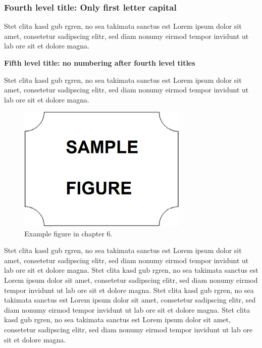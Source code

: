 \subsubsection{Fourth level title: Only first letter capital}

Stet clita kasd gub rgren, no sea takimata sanctus est Lorem ipsum dolor sit amet, consetetur sadipscing elitr, sed diam nonumy eirmod tempor invidunt ut lab ore sit et dolore magna. 

\textbf{Fifth level title: no numbering after fourth level titles}

Stet clita kasd gub rgren, no sea takimata sanctus est Lorem ipsum dolor sit amet, consetetur sadipscing elitr, sed diam nonumy eirmod tempor invidunt ut lab ore sit et dolore magna. 

\vspace{6pt} %
\begin{figure}[!ht]
    \centering
    \includegraphics[width=230pt,keepaspectratio=true]{./fig/sekil7}
    \caption{Example figure in chapter 6.}
    \label{fig:ch6-1}
\end{figure}
\vspace{-6pt} %

Stet clita kasd gub rgren, no sea takimata sanctus est Lorem ipsum dolor sit amet, consetetur sadipscing elitr, sed diam nonumy eirmod tempor invidunt ut lab ore sit et dolore magna. Stet clita kasd gub rgren, no sea takimata sanctus est Lorem ipsum dolor sit amet, consetetur sadipscing elitr, sed diam nonumy eirmod tempor invidunt ut lab ore sit et dolore magna. Stet clita kasd gub rgren, no sea takimata sanctus est Lorem ipsum dolor sit amet, consetetur sadipscing elitr, sed diam nonumy eirmod tempor invidunt ut lab ore sit et dolore magna. 
Stet clita kasd gub rgren, no sea takimata sanctus est Lorem ipsum dolor sit amet, consetetur sadipscing elitr, sed diam nonumy eirmod tempor invidunt ut lab ore sit et dolore magna. 

